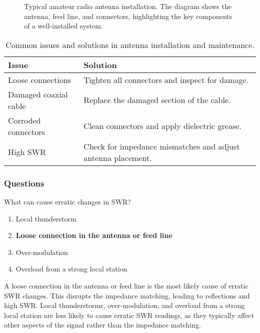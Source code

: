 \begin{figure}[h]
    \centering
    \caption{Typical amateur radio antenna installation. The diagram shows the antenna, feed line, and connectors, highlighting the key components of a well-installed system.}
    \label{fig:antenna-installation}
\end{figure}

\begin{table}[h]
    \centering
    \begin{tabular}{|l|l|}
        \hline
        \textbf{Issue} & \textbf{Solution} \\
        \hline
        Loose connections & Tighten all connectors and inspect for damage. \\
        Damaged coaxial cable & Replace the damaged section of the cable. \\
        Corroded connectors & Clean connectors and apply dielectric grease. \\
        High SWR & Check for impedance mismatches and adjust antenna placement. \\
        \hline
    \end{tabular}
    \caption{Common issues and solutions in antenna installation and maintenance.}
    \label{tab:antenna-issues}
\end{table}

\subsubsection{Questions}
\begin{tcolorbox}[colback=gray!10!white,colframe=black!75!black,title={T9B09}]
    What can cause erratic changes in SWR?
    \begin{enumerate}[label=\Alph*),noitemsep]
        \item Local thunderstorm
        \item \textbf{Loose connection in the antenna or feed line}
        \item Over-modulation
        \item Overload from a strong local station
    \end{enumerate}
\end{tcolorbox}

A loose connection in the antenna or feed line is the most likely cause of erratic SWR changes. This disrupts the impedance matching, leading to reflections and high SWR. Local thunderstorms, over-modulation, and overload from a strong local station are less likely to cause erratic SWR readings, as they typically affect other aspects of the signal rather than the impedance matching.

